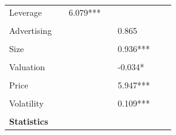 \documentclass[11pt]{article}
\begin{document}
\begin{table}[h]
\begin{tabular}{llclllc}
\multicolumn{1}{l|}{Leverage}             &  & \multicolumn{1}{l}{6.079***} &  &                                             &  &                              \\
\multicolumn{1}{l|}{}                     &  &                              &  &                                             &  &                              \\
\multicolumn{1}{l|}{Advertising}          &  &                              &  & 0.865                                       &  &                              \\
\multicolumn{1}{l|}{}                     &  &                              &  &                                             &  &                              \\
\multicolumn{1}{l|}{Size}                 &  &                              &  & 0.936***                                    &  &                              \\
\multicolumn{1}{l|}{}                     &  &                              &  &                                             &  &                              \\
\multicolumn{1}{l|}{Valuation}            &  &                              &  & -0.034*                                     &  &                              \\
\multicolumn{1}{l|}{}                     &  &                              &  &                                             &  &                              \\
\multicolumn{1}{l|}{Price}                &  &                              &  & 5.947***                                    &  &                              \\
\multicolumn{1}{l|}{}                     &  &                              &  &                                             &  &                              \\
\multicolumn{1}{l|}{Volatility}           &  &                              &  & 0.109***                                    &  &                              \\
\multicolumn{1}{l|}{}                     &  &                              &  & \multicolumn{1}{c}{}                        &  &                              \\ \midrule
\textbf{Statistics}                       &  &                              &  & \multicolumn{1}{c}{}                        &  &                              \\ \midrule

\end{tabular}
\end{table}
\end{document}
